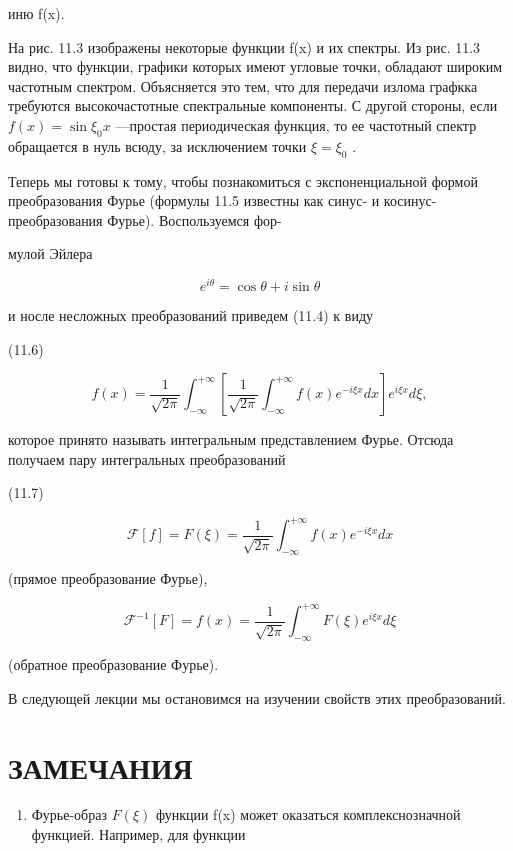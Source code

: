 \documentclass[
  ukrainian,
]{article}
\providecommand{\tightlist}{%
  \setlength{\itemsep}{0pt}\setlength{\parskip}{0pt}}
\begin{document}
иню f(x).

На рис. 11.3 изображены некоторые функции f(x) и их спектры. Из рис.
11.3 видно, что функции, графики которых имеют угловые точки, обладают
широким частотным спектром. Объясняется это тем, что для передачи излома
графкка требуются высокочастотные спектральные компоненты. С другой
стороны, если \(f(x) = \sin \xi_0 x\) ---простая периодическая функция,
то ее частотный спектр обращается в нуль всюду, за исключением точки
\(\xi = \xi_0\) .

Теперь мы готовы к тому, чтобы познакомиться с экспоненциальной формой
преобразования Фурье (формулы 11.5 известны как синус- и
косинус-преобразования Фурье). Воспользуемся фор-

мулой Эйлера

\[
e^{i\theta} = \cos \theta + i \sin \theta
\]

и носле несложных преобразований приведем (11.4) к виду

(11.6)

\[
f(x) = \frac{1}{\sqrt{2\pi}} \int_{-\infty}^{+\infty} \left[ \frac{1}{\sqrt{2\pi}} \int_{-\infty}^{+\infty} f(x) e^{-i\xi x} dx \right] e^{i\xi x} d\xi,
\]

которое принято называть интегральным представлением Фурье. Отсюда
получаем пару интегральных преобразований

(11.7)

\[
\mathcal{F}[f] = F(\xi) = \frac{1}{\sqrt{2\pi}} \int_{-\infty}^{+\infty} f(x) e^{-i\xi x} dx
\]

(прямое преобразование Фурье),

\[
\mathcal{F}^{-1}[F] = f(x) = \frac{1}{\sqrt{2\pi}} \int_{-\infty}^{+\infty} F(\xi) e^{i\xi x} d\xi
\]

(обратное преобразование Фурье).

В следующей лекции мы остановимся на изучении свойств этих
преобразований.

\section{ЗАМЕЧАНИЯ}\label{ux437ux430ux43cux435ux447ux430ux43dux438ux44f}

\begin{enumerate}
\def\labelenumi{\arabic{enumi}.}
\tightlist
\item
  Фурье-образ \(F(\xi)\) функции f(x) может оказаться комплекснозначной
  функцией. Например, для функции
\end{enumerate}
\end{document}
